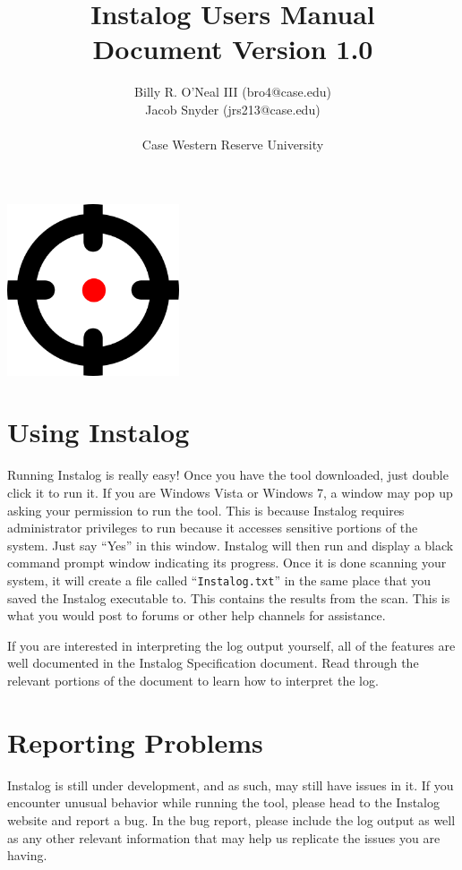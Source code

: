 \documentclass[letterpaper,12pt]{article}
\title{Instalog Users Manual \\ Document Version 1.0}
\author{
Billy R. O'Neal III (bro4@case.edu) \\
Jacob Snyder (jrs213@case.edu) \\ \\
Case Western Reserve University
}
\begin{document}
\maketitle
\vspace{1in}
\begin{center}
\includegraphics[width=2in, height=2in]{figures/InstalogLogo.png}
\end{center}
\newpage



\tableofcontents
\newpage



\section{Using Instalog}
Running Instalog is really easy!  Once you have the tool downloaded, just double
click it to run it.  If you are Windows Vista or Windows 7, a window may pop up
asking your permission to run the tool.  This is because Instalog requires
administrator privileges to run because it accesses sensitive portions of the
system.  Just say ``Yes'' in this window.  Instalog will then run and display a
black command prompt window indicating its progress.  Once it is done scanning
your system, it will create a file called ``\verb|Instalog.txt|'' in the same
place that you saved the Instalog executable to.  This contains the results from
the scan.  This is what you would post to forums or other help channels for
assistance.  

If you are interested in interpreting the log output yourself, all of the
features are well documented in the Instalog Specification document.  Read
through the relevant portions of the document to learn how to interpret the log.

\newpage



\section{Reporting Problems}
Instalog is still under development, and as such, may still have issues in it. 
If you encounter unusual behavior while running the tool, please head to the
Instalog website and report a bug.  In the bug report, please include the log
output as well as any other relevant information that may help us replicate the
issues you are having.
\end{document}
